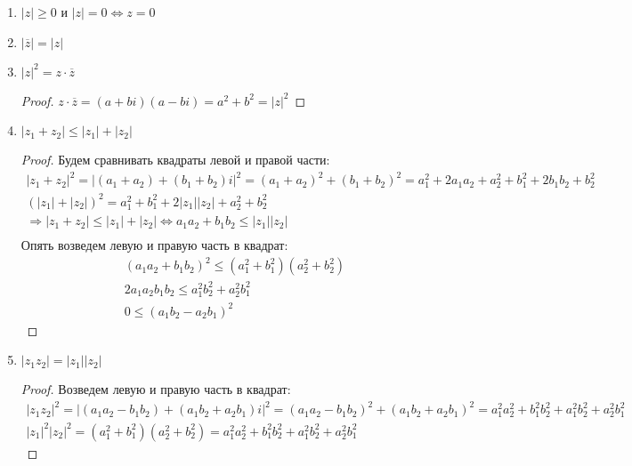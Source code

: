 \begin{enumerate}
    \item $|z| \geqslant 0$ и $|z| = 0 \Leftrightarrow z = 0$
    \item $|\overline{z}| = |z|$
    \item $|z|^2 = z \cdot \overline{z}$
    \begin{proof}
        $z \cdot \overline{z} = (a + bi)(a - bi) = a^2 + b^2 = |z|^2$
    \end{proof}
    \item $|z_1 + z_2| \leqslant |z_1| + |z_2|$
    \begin{proof}
        Будем сравнивать квадраты левой и правой части:
        \begin{gather*}
        |z_1 + z_2|^2 = |(a_1 + a_2) + (b_1 + b_2)i|^2 = (a_1 + a_2)^2 + (b_1 + b_2)^2 = a_1^2 + 2a_1a_2 + a_2^2 + b_1^2 + 2b_1b_2 + b_2^2 \\
        (|z_1| + |z_2|)^2 = a_1^2 + b_1^2 + 2|z_1||z_2|  + a_2^2 + b_2^2 \\
        \Longrightarrow |z_1 + z_2| \leqslant |z_1| + |z_2| \Leftrightarrow a_1a_2 + b_1b_2 \leqslant |z_1||z_2| \\
        \end{gather*}
        Опять возведем левую и правую часть в квадрат:
        \begin{gather*}
            (a_1a_2 + b_1b_2)^2 \leqslant (a_1^2 + b_1^2)(a_2^2 + b_2^2) \\
            2a_1a_2b_1b_2 \leqslant a_1^2b_2^2 + a_2^2b_1^2 \\
            0 \leqslant (a_1b_2 - a_2b_1)^2
        \end{gather*}
    \end{proof}
    \item $|z_1z_2| = |z_1||z_2|$
    \begin{proof}
        Возведем левую и правую часть в квадрат:
        \begin{gather*}
            |z_1z_2|^2 = |(a_1a_2 - b_1b_2) + (a_1b_2 + a_2b_1)i|^2 = (a_1a_2 - b_1b_2)^2 + (a_1b_2 + a_2b_1)^2 = a_1^2a_2^2 + b_1^2b_2^2 + a_1^2b_2^2 + a_2^2b_1^2 \\
            |z_1|^2|z_2|^2 = (a_1^2 + b_1^2)(a_2^2 + b_2^2) = a_1^2a_2^2 + b_1^2b_2^2 + a_1^2b_2^2 + a_2^2b_1^2
        \end{gather*}
    \end{proof}
\end{enumerate}
